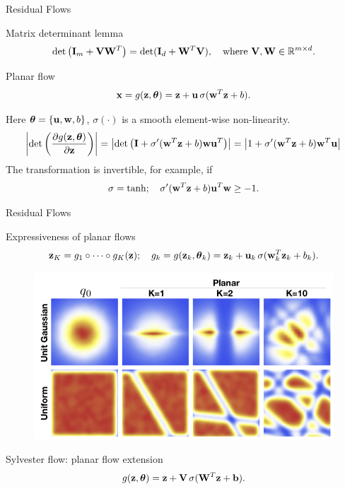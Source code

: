 \begin{frame}{Residual Flows}
	\begin{block}{Matrix determinant lemma}
		\vspace{-0.5cm}
		\[
			\det \left( \mathbf{I}_m + \mathbf{V} \mathbf{W}^T \right) = \det ( \mathbf{I}_d + \mathbf{W}^T \mathbf{V} ), \quad \text{where } \mathbf{V}, \mathbf{W} \in \mathbb{R}^{m \times d}.
		\]
		\vspace{-0.5cm}
	\end{block}
	\begin{block}{Planar flow}
		\vspace{-0.2cm}
		\[
			\mathbf{x} = g(\mathbf{z}, \boldsymbol{\theta}) = \mathbf{z} + \mathbf{u} \, \sigma(\mathbf{w}^T\mathbf{z} + b).
		\]
		\vspace{-0.3cm}
	\end{block}
	Here $\boldsymbol{\theta} = \{\mathbf{u}, \mathbf{w}, b\}$, $\sigma(\cdot)$ is a smooth element-wise non-linearity.
	{\small
	\[
		\left| \det \left( \frac{\partial g(\mathbf{z}, \boldsymbol{\theta})}{\partial \mathbf{z}} \right)\right| = \left| \det \left( \mathbf{I} + \sigma'(\mathbf{w}^T \mathbf{z} + b) \mathbf{w}\mathbf{u}^T\right) \right| = \left| 1 + \sigma'(\mathbf{w}^T \mathbf{z} + b) \mathbf{w}^T \mathbf{u} \right|
	\]}
	The transformation is invertible, for example, if
	\[
		\sigma = \tanh; \quad \sigma'(\mathbf{w}^T \mathbf{z} + b) \mathbf{u}^T \mathbf{w} \geq -1.
	\]
\end{frame}
\begin{frame}{Residual Flows}
	\begin{block}{Expressiveness of planar flows}
		\vspace{-0.5cm}
		\[
			\mathbf{z}_K = g_1 \circ \dots \circ g_K (\mathbf{z}); \quad g_k = g(\mathbf{z}_k, \boldsymbol{\theta}_k) = \mathbf{z}_k + \mathbf{u}_k\, \sigma(\mathbf{w}_k^T\mathbf{z}_k + b_k).
		\]
		\vspace{-0.8cm}
		\begin{figure}
			\centering
			\includegraphics[width=0.7\linewidth]{figs/planar_flows.png}
		\end{figure}
		\vspace{-0.5cm}
	\end{block}
	\begin{block}{Sylvester flow: planar flow extension}
		\vspace{-0.3cm}
		\[
		g(\mathbf{z}, \boldsymbol{\theta}) = \mathbf{z} + \mathbf{V} \, \sigma(\mathbf{W}^T\mathbf{z} + \mathbf{b}).
		\]
	\end{block}
\end{frame}
